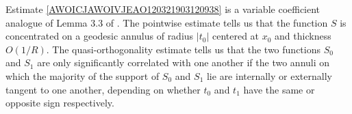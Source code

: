 %


\begin{remark}
Estimate \eqref{AWOICJAWOIVJEAO120321903120938} is a variable coefficient analogue of Lemma 3.3 of \cite{HeoandNazarovandSeeger}. The pointwise estimate tells us that the function $S$ is concentrated on a geodesic annulus of radius $|t_0|$ centered at $x_0$ and thickness $O(1/R)$. %
The quasi-orthogonality estimate tells us that the two functions $S_0$ and $S_1$ are only significantly correlated with one another if the two annuli on which the majority of the support of $S_0$ and $S_1$ lie are internally or externally tangent to one another, depending on whether $t_0$ and $t_1$ have the same or opposite sign respectively. %
%
%
\end{remark}

